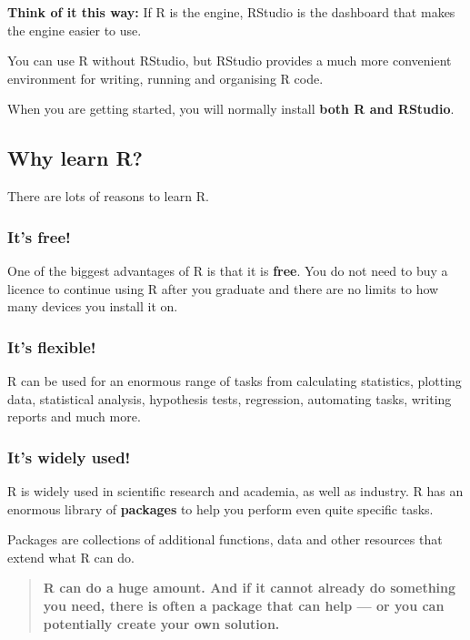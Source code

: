 \documentclass[
]{book}
\begin{document}
\textbf{Think of it this way:}
If R is the engine, RStudio is the dashboard that makes the engine easier to use.

You can use R without RStudio, but RStudio provides a much more convenient environment for writing, running and organising R code.

When you are getting started, you will normally install \textbf{both R and RStudio}.

\subsection{Why learn R?}\label{why-learn-r}

There are lots of reasons to learn R.

\subsubsection{It's free!}\label{its-free}

One of the biggest advantages of R is that it is \textbf{free}. You do not need to buy a licence to continue using R after you graduate and there are no limits to how many devices you install it on.

\subsubsection{It's flexible!}\label{its-flexible}

R can be used for an enormous range of tasks from calculating statistics, plotting data, statistical analysis, hypothesis tests, regression, automating tasks, writing reports and much more.

\subsubsection{It's widely used!}\label{its-widely-used}

R is widely used in scientific research and academia, as well as industry. R has an enormous library of \textbf{packages} to help you perform even quite specific tasks.

Packages are collections of additional functions, data and other resources that extend what R can do.

\begin{quote}
\textbf{R can do a huge amount. And if it cannot already do something you need, there is often a package that can help --- or you can potentially create your own solution.}
\end{quote}
\end{document}
